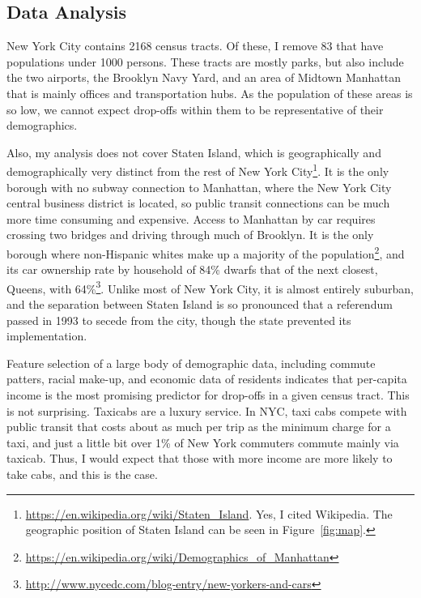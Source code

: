 \documentclass[11pt]{article}
\newcommand{\fref}[1]{Figure~\ref{fig:#1}}
\begin{document}

\subsection{Data Analysis}



New York City contains 2168 census tracts. 
Of these, I remove 83 that have populations under 1000 persons. These tracts are mostly parks, but also include the two airports, the Brooklyn Navy Yard, and an area of Midtown Manhattan that is mainly offices and transportation hubs.
As the population of these areas is so low, we cannot expect drop-offs within them to be representative of their demographics.

Also, my analysis does not cover Staten Island, which is geographically and demographically very distinct from the rest of New York City\footnote{\url{https://en.wikipedia.org/wiki/Staten_Island}. Yes, I cited Wikipedia. The geographic position of Staten Island can be seen in \fref{map}.}.
It is the only borough with no subway connection to Manhattan, where the New York City central business district is located, so public transit connections can be much more time consuming and expensive.
Access to Manhattan by car requires crossing two bridges and driving through much of Brooklyn.
It is the only borough where non-Hispanic whites make up a majority of the population\footnote{\url{https://en.wikipedia.org/wiki/Demographics_of_Manhattan}}, and its car ownership rate by household of 84\% dwarfs that of the next closest, Queens, with 64\%\footnote{\url{http://www.nycedc.com/blog-entry/new-yorkers-and-cars}}.
Unlike most of New York City, it is almost entirely suburban, and the separation between Staten Island is so pronounced that a referendum passed in 1993 to secede from the city, though the state prevented its implementation.

Feature selection of a large body of demographic data, including commute patters, racial make-up, and economic data of residents indicates that per-capita income is the most promising predictor for drop-offs in a given census tract. 
This is not surprising. Taxicabs are a luxury service. In NYC, taxi cabs compete with public transit that costs about as much per trip as the minimum charge for a taxi, and just a little bit over 1\% of New York commuters commute mainly via taxicab. 
Thus, I would expect that those with more income are more likely to take cabs, and this is the case. 
\end{document}
